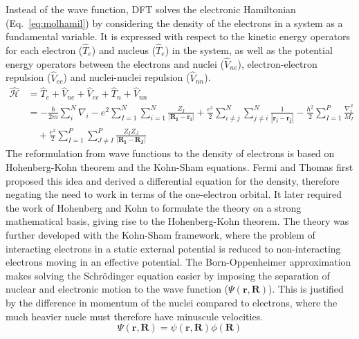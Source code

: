 Instead of the wave function, DFT solves the electronic Hamiltonian (Eq.~\ref{eq:molhamil}) by considering the density of the electrons in a system as a fundamental variable. It is expressed with respect to the kinetic energy operators for each electron ($\hat{T}_e$) and nucleus ($\hat{T}_e$) in the system, as well as the potential energy operators between the electrons and nuclei ($\hat{V}_{ne}$), electron-electron repulsion ($\hat{V}_{ee}$) and nuclei-nuclei repulsion ($\hat{V}_{nn}$). 
%
\begin{equation} \label{eq:molhamil}
\begin{split}
\hat{\mathcal{H}}  &=  \hat{T}_e + \hat{V}_{ne} + \hat{V}_{ee} + \hat{T}_{n} + \hat{V}_{nn}
\\ &= - \frac{\hbar}{2m} \sum_{i}^{N} \nabla_i - e^2 \sum_{I=1}^{N} \sum_{i=1}^{N} \frac{Z_I}{|\mathbf{R_I - r_i}|}  + \frac{e^2}{2} \sum_{i \neq j}^{N} \sum_{j \neq i}^{N} \frac{1}{|\mathbf{r_i - r_j}|} - \frac{\hbar^2}{2} \sum_{I=1}^{P} \frac{\nabla_i^2}{M_I} \\
& \quad + \frac{e^2}{2} \sum_{I=1}^{P} \sum_{J \neq I}^{P} \frac{Z_I Z_J}{|\mathbf{R_I - R_J}|}
\end{split}
\end{equation} 
%
The reformulation from wave functions to the density of electrons is based on Hohenberg-Kohn theorem and the Kohn-Sham equations. Fermi and Thomas first proposed this idea and derived a differential equation for the density,\cite{Thomas1927, fermi1927metodo} therefore negating the need to work in terms of the one-electron orbital. It later required the work of Hohenberg and Kohn to formulate the theory on a strong mathematical basis,\cite{hohkohn} giving rise to the Hohenberg-Kohn theorem. The theory was further developed with the Kohn-Sham framework,\cite{kohnsham} where the problem of interacting electrons in a static external potential is reduced to non-interacting electrons moving in an effective potential. 
%
The Born-Oppenheimer approximation makes solving the Schr\"odinger equation easier by imposing the separation of nuclear and electronic motion to the wave function ($\Psi(\mathbf{r}, \mathbf{R})$).\cite{BO} This is justified by the difference in momentum of the nuclei compared to electrons, where the much heavier nucle must therefore have minuscule velocities. 
%
\begin{equation} \label{eq:BO}
\Psi(\mathbf{r}, \mathbf{R}) = \psi(\mathbf{r}, \mathbf{R}) \phi(\mathbf{R})
\end{equation}
%
